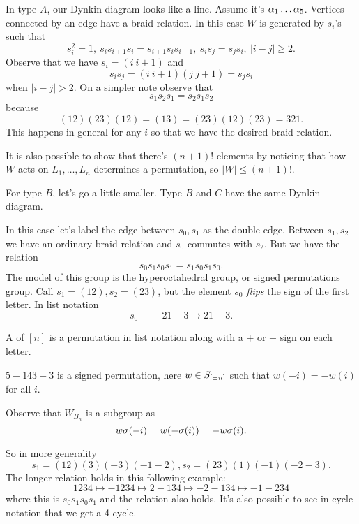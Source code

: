 \documentclass[12pt]{memoir}
\begin{document}
\begin{Ex}
    In type $A$, our Dynkin diagram looks like a line. Assume it's $\alpha_1\dots\alpha_5$. Vertices connected by an edge have a braid relation. In this case $W$ is generated by $s_i$'s such that 
    $$s_i^2=1,\ s_is_{i+1}s_i=s_{i+1}s_is_{i+1},\ s_is_j=s_js_i,\ |i-j|\geq 2.$$
    Observe that we have $s_i=(i\ i+1)$ and 
    $$s_is_j=(i\ i+1)(j\ j+1)=s_js_i$$
    when $|i-j|>2$. On a simpler note observe that 
    $$s_1s_2s_1=s_2s_1s_2$$
    because 
    $$(12)(23)(12)=(13)=(23)(12)(23)=321.$$
    This happens in general for any $i$ so that we have the desired braid relation.\par
    It is also possible to show that there's $(n+1)!$ elements by noticing that how $W$ acts on $L_1,\dots,L_n$ determines a permutation, so $|W|\leq (n+1)!$.
 \end{Ex}

 For type $B$, let's go a little smaller. Type $B$ and $C$ have the same Dynkin diagram.

 \begin{Ex}
    In this case let's label the edge between $s_0,s_1$ as the double edge. Between $s_1,s_2$ we have an ordinary braid relation and $s_0$ commutes with $s_2$. But we have the relation 
    $$s_0s_1s_0s_1=s_1s_0s_1s_0.$$
    The model of this group is the hyperoctahedral group, or signed permutations group. Call $s_1=(12),s_2=(23)$, but the element $s_0$ \emph{flips} the sign of the first letter. In list notation
    $$s_0\:\quad -21-3\mapsto 21-3.$$
 \end{Ex}

 \begin{Def}
    A  of $[n]$ is a permutation in list notation along with a $+$ or $-$ sign on each letter.
 \end{Def}

 \begin{Ex}
    $5-143-3$ is a signed permutation, here $w\in S_{\left\lbrack\pm n\right\rbrack}$ such that $w(-i)=-w(i)$ for all $i$.
 \end{Ex}

 Observe that $W_{B_{n}}$ is a subgroup as 
 $$w\sigma(-i)=w(-\sigma(i))=-w\sigma(i).$$

 So in more generality 
 $$s_1=(12)(3)(-3)(-1-2),s_2=(23)(1)(-1)(-2-3).$$
The longer relation holds in this following example:
$$1234\mapsto -1234\mapsto 2-134\mapsto -2-134\mapsto -1-234$$
where this is $s_0s_1s_0s_1$ and the relation also holds. It's also possible to see in cycle notation that we get a 4-cycle.

\ifx\nextra\undefined
\printindex
\else\fi
\nocite{*}


\end{document}
